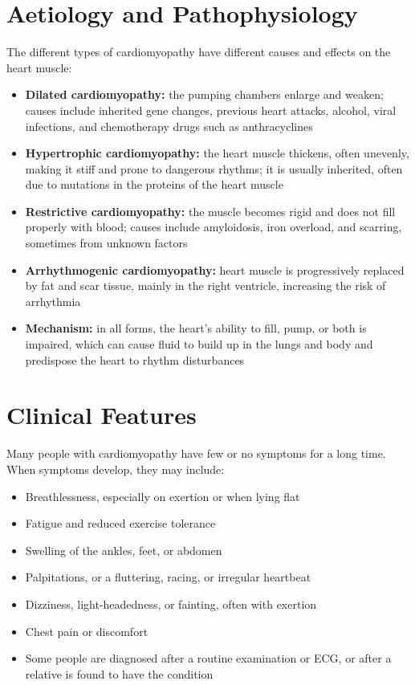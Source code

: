 \section*{Aetiology and Pathophysiology}
The different types of cardiomyopathy have different causes and effects on the heart muscle:
\begin{itemize}
    \item \textbf{Dilated cardiomyopathy:} the pumping chambers enlarge and weaken; causes include inherited gene changes, previous heart attacks, alcohol, viral infections, and chemotherapy drugs such as anthracyclines
    \item \textbf{Hypertrophic cardiomyopathy:} the heart muscle thickens, often unevenly, making it stiff and prone to dangerous rhythms; it is usually inherited, often due to mutations in the proteins of the heart muscle
    \item \textbf{Restrictive cardiomyopathy:} the muscle becomes rigid and does not fill properly with blood; causes include amyloidosis, iron overload, and scarring, sometimes from unknown factors
    \item \textbf{Arrhythmogenic cardiomyopathy:} heart muscle is progressively replaced by fat and scar tissue, mainly in the right ventricle, increasing the risk of arrhythmia
    \item \textbf{Mechanism:} in all forms, the heart's ability to fill, pump, or both is impaired, which can cause fluid to build up in the lungs and body and predispose the heart to rhythm disturbances
\end{itemize}

\section*{Clinical Features}
Many people with cardiomyopathy have few or no symptoms for a long time. When symptoms develop, they may include:
\begin{itemize}
    \item Breathlessness, especially on exertion or when lying flat
    \item Fatigue and reduced exercise tolerance
    \item Swelling of the ankles, feet, or abdomen
    \item Palpitations, or a fluttering, racing, or irregular heartbeat
    \item Dizziness, light-headedness, or fainting, often with exertion
    \item Chest pain or discomfort
    \item Some people are diagnosed after a routine examination or ECG, or after a relative is found to have the condition
\end{itemize}


